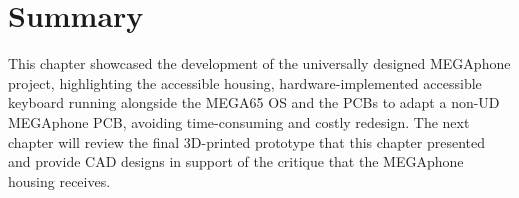 
\section{Summary}  %
This chapter showcased the development of the universally designed MEGAphone project, highlighting the accessible housing, hardware-implemented accessible keyboard running alongside the MEGA65 OS and the PCBs to adapt a non-UD MEGAphone PCB, avoiding time-consuming and costly redesign.
The next chapter will review the final 3D-printed prototype that this chapter presented and provide CAD designs in support of the critique that the MEGAphone housing receives.

